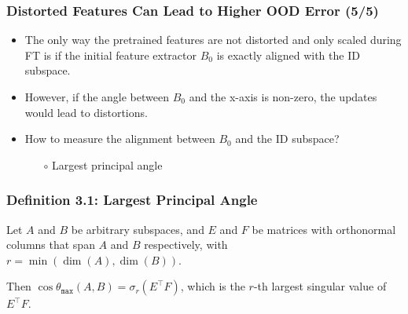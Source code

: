 \documentclass[16pt,aspectratio=169]{beamer}
\begin{document}
\begin{frame}
    \frametitle{Distorted Features Can Lead to Higher OOD Error (5/5)}

    \begin{itemize}
        \item The only way the pretrained features are not distorted and only scaled during FT is if the initial feature extractor $B_0$ is exactly aligned with the ID subspace.
        \item However, if the angle between $B_0$ and the x-axis is non-zero, the updates would lead to distortions.
        \item How to measure the alignment between $B_0$ and the ID subspace?
        \begin{itemize}
            \item[$\circ$] {\color{blue}Largest principal angle}
        \end{itemize}
    \end{itemize}

\end{frame}

\begin{frame}
    \frametitle{Definition 3.1: Largest Principal Angle}

    Let $A$ and $B$ be arbitrary subspaces, and $E$ and $F$ be matrices with orthonormal columns that span $A$ and $B$ respectively, with $r = \min(\operatorname{dim}(A), \operatorname{dim}(B))$. 
    
    Then $\cos \theta_{\mathtt{max}}(A, B) = \sigma_r (E^\top F)$, which is the $r$-th largest singular value of $E^\top F$.

\end{frame}
\end{document}

